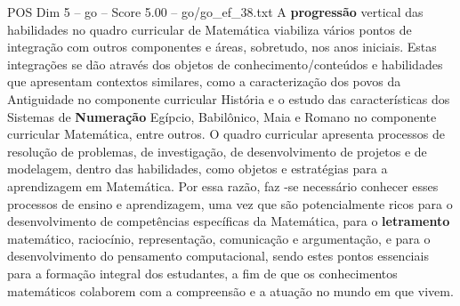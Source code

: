 \begin{textsample}{POS Dim 5 – go – Score 5.00 – go/go\_ef\_38.txt}
A \textbf{progressão} vertical das habilidades no quadro curricular de Matemática viabiliza vários pontos de integração com outros componentes e áreas, sobretudo, nos anos iniciais.
Estas integrações se dão através dos objetos de conhecimento/conteúdos e habilidades que apresentam contextos similares, como a caracterização dos povos da Antiguidade no componente curricular História e o estudo das características dos Sistemas de \textbf{Numeração} Egípcio, Babilônico, Maia e Romano no componente curricular Matemática, entre outros.
O quadro curricular apresenta processos de resolução de problemas, de investigação, de desenvolvimento de projetos e de modelagem, dentro das habilidades, como objetos e estratégias para a aprendizagem em Matemática.
Por essa razão, faz -se necessário conhecer esses processos de ensino e aprendizagem, uma vez que são potencialmente ricos para o desenvolvimento de competências específicas da Matemática, para o \textbf{letramento} matemático, raciocínio, representação, comunicação e argumentação, e para o desenvolvimento do pensamento computacional, sendo estes pontos essenciais para a formação integral dos estudantes, a fim de que os conhecimentos matemáticos colaborem com a compreensão e a atuação no mundo em que vivem.

\end{textsample}
